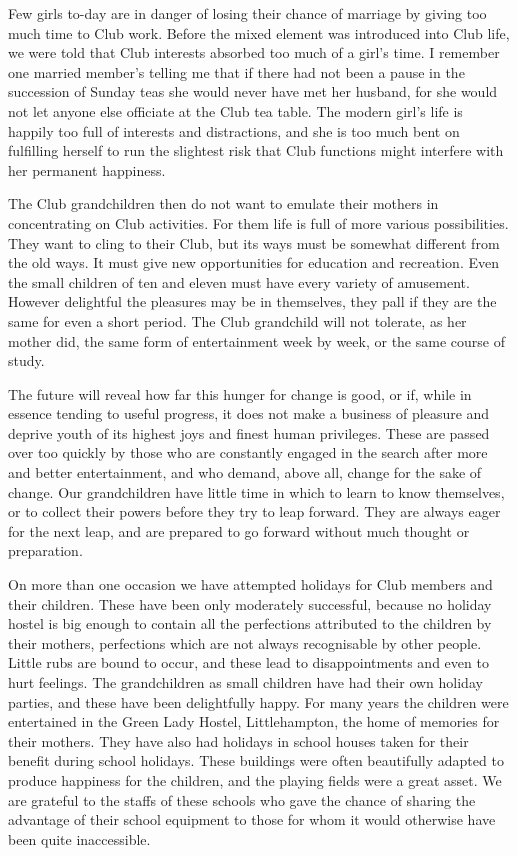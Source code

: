 Few girls to-day are in danger of losing their chance of
marriage by giving too much time to Club work. Before
the mixed element was introduced into Club life, we
were told that Club interests absorbed too much of a girl’s
time. I remember one married member’s telling me that
if there had not been a pause in the succession of Sunday
teas she would never have met her husband, for she would
not let anyone else officiate at the Club tea table. The
modern girl’s life is happily too full of interests and distractions,
and she is too much bent on fulfilling herself to
run the slightest risk that Club functions might interfere
with her permanent happiness.

The Club grandchildren then do not want to emulate
their mothers in concentrating on Club activities. For
them life is full of more various possibilities. They want
to cling to their Club, but its ways must be somewhat
different from the old ways. It must give new opportunities
for education and recreation. Even the small children
of ten and eleven must have every variety of amusement.
However delightful the pleasures may be in themselves,
they pall if they are the same for even a short period. The
Club grandchild will not tolerate, as her mother did, the
same form of entertainment week by week, or the same
course of study.

The future will reveal how far this hunger for change
is good, or if, while in essence tending to useful progress,
it does not make a business of pleasure and deprive youth
of its highest joys and finest human privileges. These are
passed over too quickly by those who are constantly
engaged in the search after more and better entertainment,
and who demand, above all, change for the sake
of change. Our grandchildren have little time in which
to learn to know themselves, or to collect their powers
before they try to leap forward. They are always eager
for the next leap, and are prepared to go forward without
much thought or preparation.

On more than one occasion we have attempted holidays
for Club members and their children. These have
been only moderately successful, because no holiday hostel
is big enough to contain all the perfections attributed to
the children by their mothers, perfections which are not
always recognisable by other people. Little rubs are bound
to occur, and these lead to disappointments and even to
hurt feelings. The grandchildren as small children have
had their own holiday parties, and these have been
delightfully happy. For many years the children were
entertained in the Green Lady Hostel, Littlehampton, the
home of memories for their mothers. They have also had
holidays in school houses taken for their benefit during
school holidays. These buildings were often beautifully
adapted to produce happiness for the children, and the
playing fields were a great asset. We are grateful to the
staffs of these schools who gave the chance of sharing the
advantage of their school equipment to those for whom it
would otherwise have been quite inaccessible.

